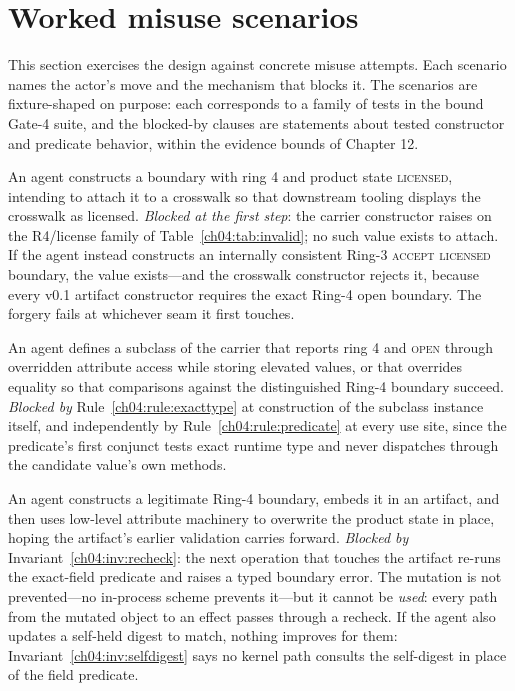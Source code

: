 \section{Worked misuse scenarios}\label{ch04:scenarios}

This section exercises the design against concrete misuse attempts. Each
scenario names the actor's move and the mechanism that blocks it. The
scenarios are fixture-shaped on purpose: each corresponds to a family of
tests in the bound Gate-4 suite, and the blocked-by clauses are statements
about tested constructor and predicate behavior, within the evidence bounds
of Chapter 12.

\begin{example}\label{ch04:ex:forge}
An agent constructs a boundary with ring 4 and product state
\textsc{licensed}, intending to attach it to a crosswalk so that downstream
tooling displays the crosswalk as licensed. \emph{Blocked at the first
step}: the carrier constructor raises on the R4/license family of
Table~\ref{ch04:tab:invalid}; no such value exists to attach. If the agent
instead constructs an internally consistent Ring-3 \textsc{accept}
\textsc{licensed} boundary, the value exists---and the crosswalk constructor
rejects it, because every v0.1 artifact constructor requires the exact
Ring-4 open boundary. The forgery fails at whichever seam it first touches.
\end{example}

\begin{example}\label{ch04:ex:subclass}
An agent defines a subclass of the carrier that reports ring 4 and
\textsc{open} through overridden attribute access while storing elevated
values, or that overrides equality so that comparisons against the
distinguished Ring-4 boundary succeed. \emph{Blocked by}
Rule~\ref{ch04:rule:exacttype} at construction of the subclass instance
itself, and independently by Rule~\ref{ch04:rule:predicate} at every use
site, since the predicate's first conjunct tests exact runtime type and
never dispatches through the candidate value's own methods.
\end{example}

\begin{example}\label{ch04:ex:mutation}
An agent constructs a legitimate Ring-4 boundary, embeds it in an artifact,
and then uses low-level attribute machinery to overwrite the product state
in place, hoping the artifact's earlier validation carries forward.
\emph{Blocked by} Invariant~\ref{ch04:inv:recheck}: the next operation that
touches the artifact re-runs the exact-field predicate and raises a typed
boundary error. The mutation is not prevented---no in-process scheme
prevents it---but it cannot be \emph{used}: every path from the mutated
object to an effect passes through a recheck. If the agent also updates a
self-held digest to match, nothing improves for them:
Invariant~\ref{ch04:inv:selfdigest} says no kernel path consults the
self-digest in place of the field predicate.
\end{example}

